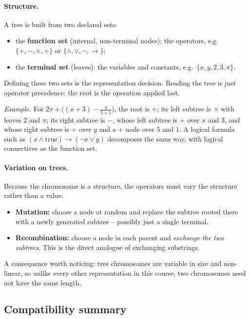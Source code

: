 \documentclass[11pt,a4paper]{article}
\begin{document}
\paragraph{Structure.}
A tree is built from two declared sets:
\begin{itemize}
\item the \textbf{function set} (internal, non-terminal nodes): the operators,
      e.g.\ $\{+,-,\times,\div\}$ or $\{\wedge,\vee,\neg,\rightarrow\}$;
\item the \textbf{terminal set} (leaves): the variables and constants, e.g.\
      $\{x,y,2,3,\pi\}$.
\end{itemize}
Defining these two sets is the representation decision. Reading the tree is
just operator precedence: the root is the operation applied last.

\emph{Example.} For $2\pi+\bigl((x+3)-\tfrac{y}{5+1}\bigr)$, the root is
$+$; its left subtree is $\times$ with leaves $2$ and $\pi$; its right
subtree is $-$, whose left subtree is $+$ over $x$ and $3$, and whose right
subtree is $\div$ over $y$ and a $+$ node over $5$ and $1$. A logical formula
such as $(x\wedge \text{true})\rightarrow(\neg x\vee y)$ decomposes the same
way, with logical connectives as the function set.

\paragraph{Variation on trees.}
Because the chromosome is a structure, the operators must vary the structure
rather than a value.
\begin{itemize}
\item \textbf{Mutation:} choose a node at random and replace the subtree
      rooted there with a newly generated subtree -- possibly just a single
      terminal.
\item \textbf{Recombination:} choose a node in each parent and \emph{exchange
      the two subtrees}. This is the direct analogue of exchanging substrings.
\end{itemize}
A consequence worth noticing: tree chromosomes are variable in size and
non-linear, so unlike every other representation in this course, two
chromosomes need not have the same length.

\subsection{Compatibility summary}
\end{document}
